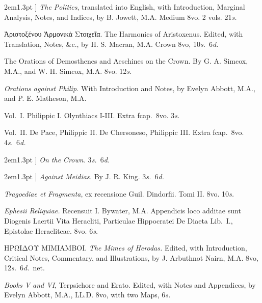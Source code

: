 \documentclass[12pt,oneside]{book}[2021/10/04]
\newcommand{\longdash}{\rule[.5ex]{2em}{1.3pt}
}
\newenvironment{advlist}{
  \begin{description}[leftmargin=1em, parsep=0.2ex, listparindent=1em,]
}{\end{description}}
\newenvironment{vollist}{
\begin{description}[nosep, topsep=-1ex, itemindent=-1em, leftmargin=2em]
}{\end{description}}
\newcommand{\¬}{\hphantom{0}}
\begin{document}
\begin{advlist}
\item[\longdash] \textit{The Politics}, translated
into English, with Introduction,
Marginal Analysis, Notes,
and Indices, by B. Jowett, M.A.
Medium 8vo. 2 vols. 21\textit{s.}

\item[Aristoxenus.] {\greekfont Ἀριστοξένου
Ἁρμονικὰ Στοιχεῖα.} The Harmonics
of Aristoxenus. Edited, with
Translation, Notes, \&c., by H. S.
Macran, M.A. Crown 8vo, 10\textit{s.}\ 6\textit{d.}

\item[Demosthenes and Aeschines.]
The Orations of Demosthenes and
Aeschines on the Crown. By
G. A. Simcox, M.A., and W. H.
Simcox, M.A. 8vo. 12\textit{s.}

\item[Demosthenes.] \textit{Orations
against Philip.} With Introduction
and Notes, by Evelyn Abbott, M.A.,
and P. E. Matheson, M.A.
\begin{vollist}
\item Vol.\ I. Philippic I. Olynthiacs
I-III. Extra fcap.\ 8vo. 3\textit{s.}
\item Vol.\ II. De Pace, Philippic II.
De Chersoneso, Philippic III.
Extra fcap.\ 8vo. 4\textit{s.}\ 6\textit{d.}
\end{vollist}

\item[\longdash] \textit{On the Crown.} 3\textit{s.}\ 6\textit{d.}

\item[\longdash] \textit{Against Meidias.} By
J. R. King. 3\textit{s.}\ 6\textit{d.}

\item[Euripides.] \textit{Tragoediae et
Fragmenta}, ex recensione Guil. Dindorfii.
Tomi II. 8vo. 10\textit{s.}

\item[Heracliti.] \textit{Ephesii Reliquiae.}
Recensuit I. Bywater, M.A. Appendicis
loco additae sunt Diogenis
Laertii Vita Heracliti, Particulae
Hippocratei De Diaeta Lib.\ I., Epistolae
Heracliteae. 8vo. 6\textit{s.}

\item[Herodas.] {\greekfont ΗΡΩΙΔΟΥ ΜΙΜΙΑΜΒΟΙ.}
\textit{The Mimes of Herodas.}
Edited, with Introduction, Critical
Notes, Commentary, and Illustrations,
by J. Arbuthnot Nairn, M.A.
8vo, 12\textit{s.}\ 6\textit{d.}\ net.

\item[Herodotus.] \textit{Books V and VI},
Terpsichore and Erato. Edited,
with Notes and Appendices, by
Evelyn Abbott, M.A., LL.D. 8vo,
with two Maps, 6\textit{s.}


\end{advlist}
\end{document}
